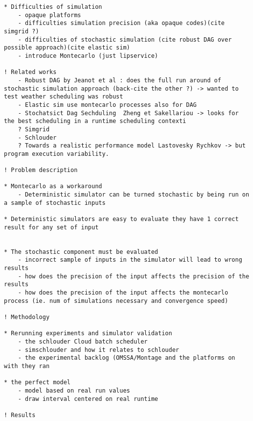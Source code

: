 \documentclass[10pt,conference,compsocconf]{IEEEtran}
\begin{document}





\newpage
\begin{verbatim}
* Difficulties of simulation
	- opaque platforms
	- difficulties simulation precision (aka opaque codes)(cite simgrid ?)
	- difficulties of stochastic simulation (cite robust DAG over possible approach)(cite elastic sim)
	- introduce Montecarlo (just lipservice)

! Related works
	- Robust DAG by Jeanot et al : does the full run around of stochastic simulation approach (back-cite the other ?) -> wanted to test weather scheduling was robust
	- Elastic sim use montecarlo processes also for DAG	
	- Stochatsict Dag Sechduling  Zheng et Sakellariou -> looks for the best scheduling in a runtime scheduling contexti
	? Simgrid
	- Schlouder
	? Towards a realistic performance model Lastovesky Rychkov -> but program execution variability.

! Problem description
	
* Montecarlo as a workaround 
	- Deterministic simulator can be turned stochastic by being run on a sample of stochastic inputs

* Deterministic simulators are easy to evaluate they have 1 correct result for any set of input 


* The stochastic component must be evaluated
	- incorrect sample of inputs in the simulator will lead to wrong results
	- how does the precision of the input affects the precision of the results
	- how does the precision of the input affects the montecarlo process (ie. num of simulations necessary and convergence speed)

! Methodology 

* Rerunning experiments and simulator validation
	- the schlouder Cloud batch scheduler
	- simschlouder and how it relates to schlouder
	- the experimental backlog (OMSSA/Montage and the platforms on with they ran

* the perfect model
	- model based on real run values
	- draw interval centered on real runtime

! Results
\end{verbatim}
\end{document}
